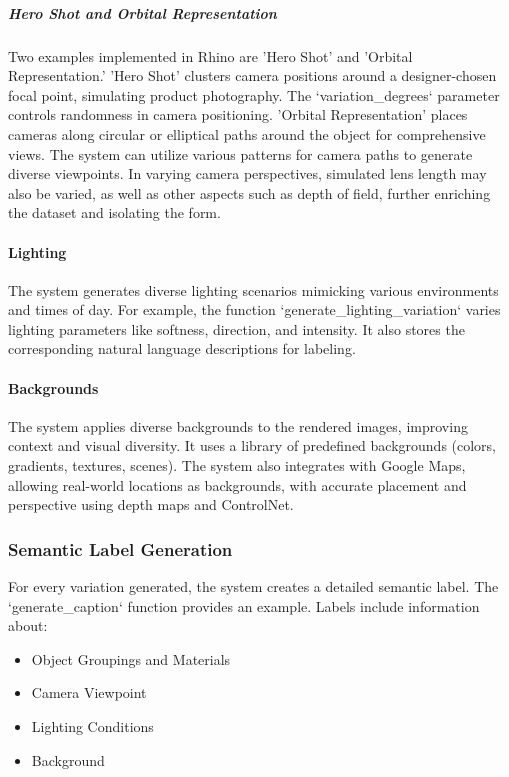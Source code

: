 \documentclass[12pt]{article}
\begin{document}
\subparagraph{Hero Shot and Orbital Representation}
Two examples implemented in Rhino are 'Hero Shot' and 'Orbital Representation.' 'Hero Shot' clusters camera positions around a designer-chosen focal point, simulating product photography. The `variation\_degrees` parameter controls randomness in camera positioning. 'Orbital Representation' places cameras along circular or elliptical paths around the object for comprehensive views. The system can utilize various patterns for camera paths to generate diverse viewpoints. In varying camera perspectives, simulated lens length may also be varied, as well as other aspects such as depth of field, further enriching the dataset and isolating the form.

\paragraph{Lighting}
The system generates diverse lighting scenarios mimicking various environments and times of day. For example, the function `generate\_lighting\_variation` varies lighting parameters like softness, direction, and intensity. It also stores the corresponding natural language descriptions for labeling.

\paragraph{Backgrounds}
The system applies diverse backgrounds to the rendered images, improving context and visual diversity. It uses a library of predefined backgrounds (colors, gradients, textures, scenes). The system also integrates with Google Maps, allowing real-world locations as backgrounds, with accurate placement and perspective using depth maps and ControlNet.

\subsubsection{Semantic Label Generation}
For every variation generated, the system creates a detailed semantic label. The `generate\_caption` function provides an example. Labels include information about:

\begin{itemize}
    \item Object Groupings and Materials
    \item Camera Viewpoint
    \item Lighting Conditions
    \item Background
\end{itemize}
\end{document}

